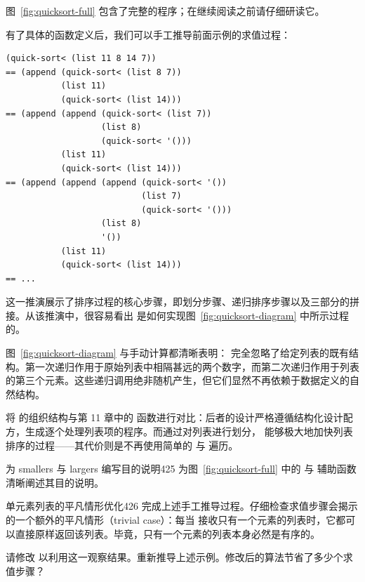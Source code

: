 图~\ref{fig:quicksort-full} 包含了完整的程序；在继续阅读之前请仔细研读它。

有了具体的函数定义后，我们可以手工推导前面示例的求值过程：

\begin{lstlisting}[language=BSL]
  (quick-sort< (list 11 8 14 7))
== (append (quick-sort< (list 8 7))
           (list 11)
           (quick-sort< (list 14)))
== (append (append (quick-sort< (list 7))
                   (list 8)
                   (quick-sort< '()))
           (list 11)
           (quick-sort< (list 14)))
== (append (append (append (quick-sort< '())
                           (list 7)
                           (quick-sort< '()))
                   (list 8)
                   '())
           (list 11)
           (quick-sort< (list 14)))
== ...
\end{lstlisting}

这一推演展示了排序过程的核心步骤，即划分步骤、递归排序步骤以及三部分的拼接。从该推演中，很容易看出  是如何实现图~\ref{fig:quicksort-diagram} 中所示过程的。

图~\ref{fig:quicksort-diagram} 与手动计算都清晰表明： 完全忽略了给定列表的既有结构。第一次递归作用于原始列表中相隔甚远的两个数字，而第二次递归作用于列表的第三个元素。这些递归调用绝非随机产生，但它们显然不再依赖于数据定义的自然结构。

将  的组织结构与第 11 章中的  函数进行对比：后者的设计严格遵循结构化设计配方，生成逐个处理列表项的程序。而通过对列表进行划分， 能够极大地加快列表排序的过程——其代价则是不再使用简单的  与  遍历。

\begin{exercise}{为 smallers 与 largers 编写目的说明}{425}\label{ex:425}
为图~\ref{fig:quicksort-full} 中的  与  辅助函数清晰阐述其目的说明。
\end{exercise}

\begin{exercise}{单元素列表的平凡情形优化}{426}\label{ex:426}
完成上述手工推导过程。仔细检查求值步骤会揭示  的一个额外的平凡情形（trivial case）：每当  接收只有一个元素的列表时，它都可以直接原样返回该列表。毕竟，只有一个元素的列表本身必然是有序的。

请修改  以利用这一观察结果。重新推导上述示例。修改后的算法节省了多少个求值步骤？
\end{exercise}


